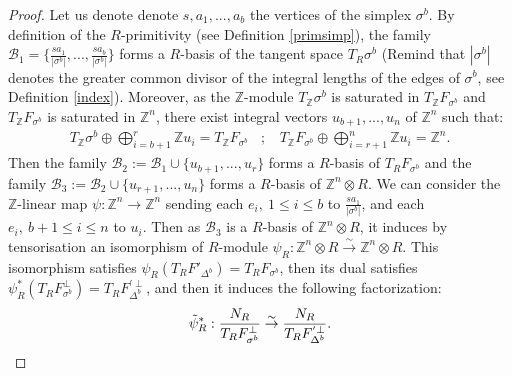 \documentclass{article}
\begin{document}
\begin{proof}
    Let us denote denote $s,a_1,...,a_b$ the vertices of the simplex $\sigma^b$. By definition of the $R$-primitivity (see Definition \ref{primsimp}), the family $\mathcal{B}_1=\{\frac{sa_1}{|\sigma^b|},...,\frac{sa_b}{|\sigma^b|}\}$ forms a $R$-basis of the tangent space $T_R\sigma^b$ (Remind that $|\sigma^b|$ denotes the greater common divisor of the integral lengths of the edges of $\sigma^b$, see Definition \ref{index}). Moreover, as the $\mathbb{Z}$-module $T_{\mathbb{Z}}\sigma^b$ is saturated in $T_{\mathbb{Z}}F_{\sigma^b}$ and $T_{\mathbb{Z}}F_{\sigma^b}$ is saturated in $\mathbb{Z}^n$, there exist integral vectors $u_{b+1},...,u_n$ of $\mathbb{Z}^n$ such that:
    \begin{align*}
        T_{\mathbb{Z}}\sigma^b\oplus\bigoplus_{i=b+1}^r \mathbb{Z}u_i=T_{\mathbb{Z}}F_{\sigma^b}~~~~;~~~~
        T_{\mathbb{Z}}F_{\sigma^b}\oplus\bigoplus_{i=r+1}^n \mathbb{Z}u_i=\mathbb{Z}^n.
    \end{align*}
    Then the family $\mathcal{B}_2:=\mathcal{B}_1\cup\{u_{b+1},...,u_{r}\}$ forms a $R$-basis of $T_RF_{\sigma^b}$ and the family $\mathcal{B}_3:=\mathcal{B}_2\cup\{u_{r+1},...,u_n\}$ forms a $R$-basis of $\mathbb{Z}^n\otimes R$. We can consider the $\mathbb{Z}$-linear map $\psi: \mathbb{Z}^n\rightarrow\mathbb{Z}^n$ sending each $e_i, ~ 1 \leq i \leq b$ to $\frac{sa_1}{|\sigma^b|}$, and each $e_i,~b+1\leq i \leq n$ to $u_i$. Then as $\mathcal{B}_3$ is a $R$-basis of $\mathbb{Z}^n\otimes R$, it induces by tensorisation an isomorphism of $R$-module $\psi_R:\mathbb{Z}^n\otimes R \overset{\sim}{\rightarrow} \mathbb{Z}^n\otimes R$. This isomorphism satisfies $\psi_R(T_RF'_{\Delta^b})=T_RF_{\sigma^b}$, then its dual satisfies $\psi_R^*(T_RF^{\perp}_{\sigma^b})=T_RF^{'\perp}_{\Delta^b}$, and then it induces the following factorization:
    \begin{equation*}
        \Tilde{\psi}_R^*: \frac{N_R}{T_RF^{\perp}_{\sigma^b}} \overset{\sim}{\rightarrow}\frac{N_R}{T_RF^{'\perp}_{\Delta^b}}.
    \end{equation*}

\end{proof}
\end{document}
